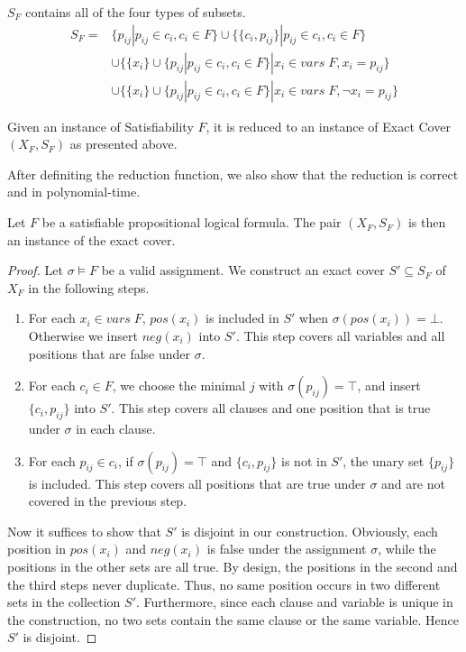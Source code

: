 $S_F$ contains all of the four types of subsets.
\begin{align*}
    S_F =& \{{p_{ij}} | p_{ij} \in c_i, c_i \in F \} 
    \cup \{\{c_i, p_{ij}\} | p_{ij} \in c_i, c_i \in F \} \\
    &\cup \{\{x_i\} \cup \{p_{ij} | p_{ij} \in c_i, c_i \in F\} | x_i \in vars\; F, x_i = p_{ij}\}\\
    &\cup \{\{x_i\} \cup \{p_{ij} | p_{ij} \in c_i, c_i \in F\} | x_i \in vars\; F, \neg x_i = p_{ij}\}
\end{align*}
\begin{definition}
    Given an instance of Satisfiability $F$, 
    it is reduced to an instance of Exact Cover $(X_F, S_F)$ as presented above.
\end{definition}
After definiting the reduction function,
we also show that the reduction is correct and in polynomial-time.
\begin{lemma}[Soundess]
    \label{lemma:xcsound}
    Let $F$ be a satisfiable propositional logical formula. The pair $(X_F, S_F)$ is then an instance of the exact cover.
\end{lemma}
\begin{proof}
    Let $\sigma \models F$ be a valid assignment. We construct an exact cover $S' \subseteq S_F$ of $X_F$ in the following steps.
\begin{enumerate}
    \item For each $x_i \in vars\; F$, $pos(x_i)$ is included in $S'$ when $\sigma(pos(x_i)) = \bot$. Otherwise we insert $neg(x_i)$ into $S'$.
    This step covers all variables and all positions that are false under $\sigma$.
    \item For each $c_i \in F$, we choose the minimal $j$ with $\sigma(p_{ij}) = \top$, and insert $\{c_i, p_{ij}\}$ into $S'$.
    This step covers all clauses and one position that is true under $\sigma$ in each clause.
    \item For each $p_{ij} \in c_i$, if $\sigma(p_{ij}) = \top$ and $\{c_i, p_{ij}\}$ is not in $S'$, the unary set $\{p_{ij}\}$ is included. 
    This step covers all positions that are true under $\sigma$ and are not covered in the previous step.
\end{enumerate}
Now it suffices to show that $S'$ is disjoint in our construction.
Obviously, each position in $pos(x_i)$ and $neg(x_i)$ is false under the assignment $\sigma$, 
while the positions in the other sets are all true. By design, the positions in the second and the third steps never duplicate. 
Thus, no same position occurs in two different sets in the collection $S'$. 
Furthermore, since each clause and variable is unique in the construction, no two sets contain the same clause or the same variable.
Hence $S'$ is disjoint.
\end{proof}
